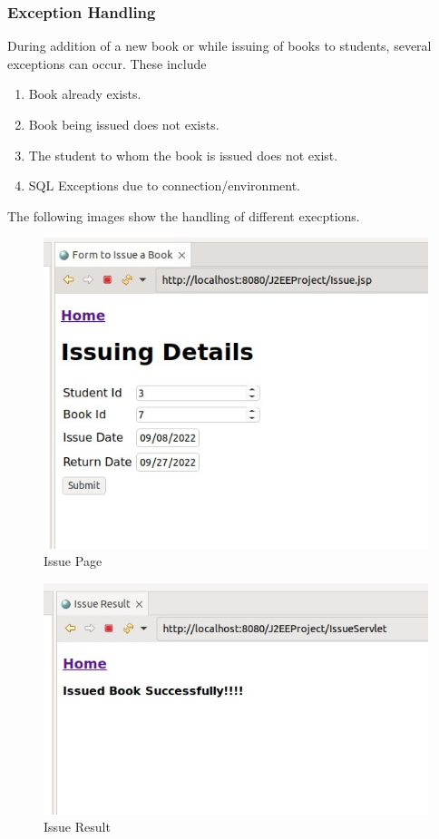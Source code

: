 \documentclass{article}
\begin{document}
\subsubsection{Exception Handling}
During addition of a new book or while issuing of books to students,
several exceptions can occur. These include
\begin{enumerate}
  \item Book already exists.
  \item Book being issued does not exists.
  \item The student to whom the book is issued does not exist.
  \item SQL Exceptions due to connection/environment.
\end{enumerate}
The following images show the handling of different execptions.
\begin{figure}[!ht]
  \begin{center}
    \includegraphics[scale=0.5]{3_issue.jpg}
  \caption{Issue Page}
  \end{center}
\end{figure}
\begin{figure}[!ht]
  \begin{center}
    \includegraphics[scale=0.5]{3_issue_result.jpg}
  \caption{Issue Result}
  \end{center}
\end{figure}
\end{document}
